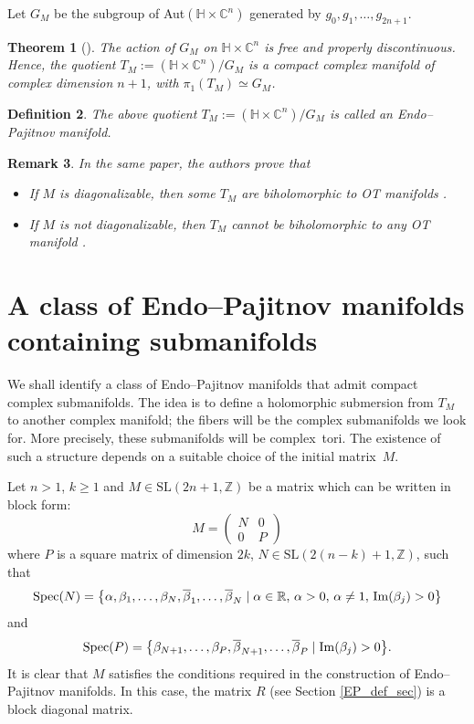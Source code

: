 \documentclass[10pt,a4paper]{amsart}
\newcommand{\6}{\partial}
\renewcommand{\Im}{\operatorname{Im}}
\numberwithin{equation}{section}
\newtheorem{Theorem}{Theorem}[section]
\newtheorem{Definition}[Theorem]{Definition}
\newtheorem{Remark}[Theorem]{Remark}
\begin{document}
Let $G_M$ be the subgroup of Aut$(\mathbb{H} \times \mathbb{C}^n)$ generated by $g_0, g_1, \dots, g_{2n+1}$.

\begin{Theorem}[{\cite{pajitnov1}}] The action of $G_M$ on $\mathbb{H} \times \mathbb{C}^n$ is free and properly discontinuous. Hence, the quotient $T_M:= (\mathbb{H} \times \mathbb{C}^n)/G_M$ is a compact complex manifold of complex dimension $n+1$, with $\pi_1(T_M) \simeq G_M$.
\end{Theorem}

\begin{Definition}
The above quotient $T_M:= (\mathbb{H} \times \mathbb{C}^n)/G_M$ is called an \emph{Endo--Pajitnov manifold}.
\end{Definition}

\begin{Remark}
In the same paper, the authors prove that
\begin{itemize}\itemsep=0pt
\item If $M$ is diagonalizable, then some $T_M$ are biholomorphic to OT manifolds \cite[Proposition~5.3]{pajitnov1}.
\item If $M$ is not diagonalizable, then $T_M$ cannot be biholomorphic to any OT manifold \cite[Proposition~5.6]{pajitnov1}.
\end{itemize}
\end{Remark}


\section{A class of Endo--Pajitnov manifolds containing submanifolds}

We shall identify a class of Endo--Pajitnov manifolds that admit compact complex submanifolds. The idea is to define a holomorphic submersion from $T_M$ to another complex manifold; the fibers will be the complex submanifolds we look for. More precisely, these submanifolds will be complex~tori.
The existence of such a structure depends on a suitable choice of the initial matrix~$M$.

Let $n > 1$, $k \geq 1$ and $M \in \textrm{SL}(2n+1, \mathbb{Z})$ be a matrix which can be written in block form:
\[
M = \begin{pmatrix}
N & 0 \\
0 & P
\end{pmatrix}
\]
where \( P \) is a square matrix of dimension \( 2k \), \( N \in \textrm{SL}(2(n-k)+1, \mathbb{Z}) \), such that
\[
{\rm Spec}(N) = \bigl\{ \alpha, \beta_1, \dots, \beta_N, \overline{\beta}_1, \dots, \overline{\beta}_N \mid \alpha \in \mathbb{R},\, \alpha > 0,\, \alpha \neq 1,\, \Im(\beta_j) > 0 \bigr\}
\]
and
\[
{\rm Spec}(P) = \bigl\{ \beta_{N+1}, \dots, \beta_{P}, \overline{\beta}_{N+1}, \dots, \overline{\beta}_{P} \mid \Im(\beta_j) > 0 \bigr\}.
\]
It is clear that $M$ satisfies the conditions required in the construction of Endo--Pajitnov manifolds.
In this case, the matrix $R$ (see Section \ref{EP_def_sec}) is a block diagonal matrix.
\end{document}
